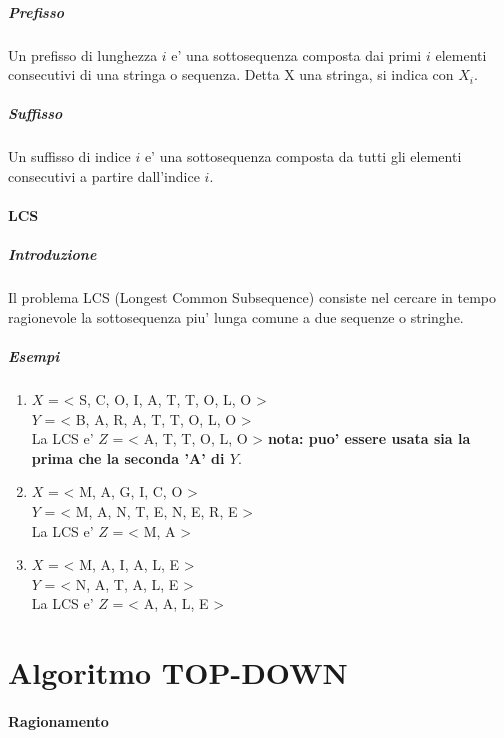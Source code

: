 \subparagraph{Prefisso}

Un prefisso di lunghezza $i$ e' una sottosequenza composta dai primi $i$ elementi consecutivi di una stringa o sequenza.
Detta X una stringa, si indica con $X_{i}$.

\subparagraph{Suffisso}

Un suffisso di indice $i$ e' una sottosequenza composta da tutti gli elementi consecutivi a partire dall'indice $i$.

\paragraph{LCS}

\subparagraph{Introduzione}

Il problema LCS (Longest Common Subsequence) consiste nel cercare in tempo ragionevole la sottosequenza piu' lunga comune a due sequenze o stringhe.

\subparagraph{Esempi}

\begin{enumerate}

\item

$X$ = < S, C, O, I, A, T, T, O, L, O > \\
$Y$ = < B, A, R, A, T, T, O, L, O > \\
La LCS e' $Z$ = < A, T, T, O, L, O >
\textbf{nota: puo' essere usata sia la prima che la seconda 'A' di $Y$}.

\item

$X$ = < M, A, G, I, C, O > \\
$Y$ = < M, A, N, T, E, N, E, R, E > \\
La LCS e' $Z$ = < M, A >

\item

$X$ = < M, A, I, A, L, E > \\
$Y$ = < N, A, T, A, L, E > \\
La LCS e' $Z$ = < A, A, L, E >

\end{enumerate}

\section{Algoritmo TOP-DOWN}

\paragraph{Ragionamento}

